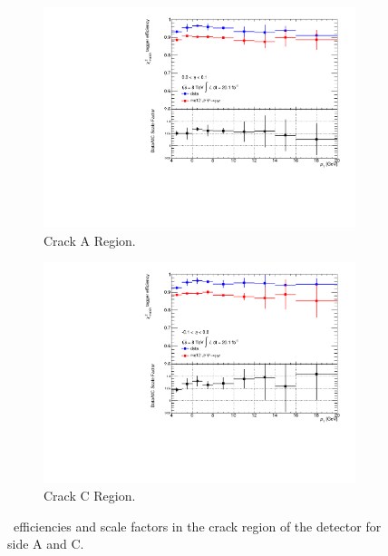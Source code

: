 \begin{figure}[htbp]
  \centering
    \begin{subfigure}[b]{0.85\textwidth}
        \includegraphics[width=\textwidth]{PartCalibration2012/Plots/SFPlots/Crack_A_smt.pdf}
        \caption{Crack A Region.}\label{fig:CalibrationScaleFactorCrackA}
    \end{subfigure}
  
    \begin{subfigure}[b]{0.85\textwidth}
        \includegraphics[width=\textwidth]{PartCalibration2012/Plots/SFPlots/Crack_C_smt.pdf}
        \caption{Crack C Region.}\label{fig:CalibrationScaleFactorCrackC}
    \end{subfigure}
    \caption[\xsm\ efficiencies and scale factors in the crack region of the detector for side A and C.]{\xsm\ efficiencies and scale factors in the crack region of the detector for side  A and  C.}\label{fig:CalibrationScaleFactorCrack}
\end{figure}

